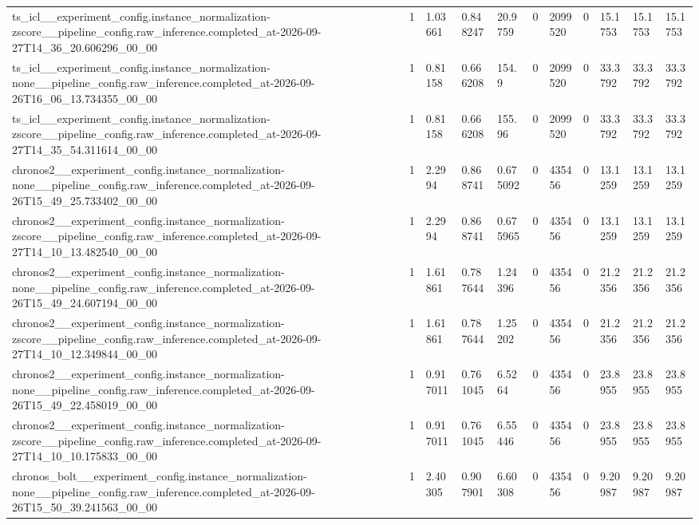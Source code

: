 \begin{tabular}{lllllllllll}
ts\_icl\_\_experiment\_config.instance\_normalization-zscore\_\_pipeline\_config.raw\_inference.completed\_at-2026-09-27T14\_36\_20.606296\_00\_00 & 1 & 1.03661 & 0.848247 & 20.9759 & 0 & 2099520 & 0 & 15.1753 & 15.1753 & 15.1753 \\
ts\_icl\_\_experiment\_config.instance\_normalization-none\_\_pipeline\_config.raw\_inference.completed\_at-2026-09-26T16\_06\_13.734355\_00\_00 & 1 & 0.81158 & 0.666208 & 154.9 & 0 & 2099520 & 0 & 33.3792 & 33.3792 & 33.3792 \\
ts\_icl\_\_experiment\_config.instance\_normalization-zscore\_\_pipeline\_config.raw\_inference.completed\_at-2026-09-27T14\_35\_54.311614\_00\_00 & 1 & 0.81158 & 0.666208 & 155.96 & 0 & 2099520 & 0 & 33.3792 & 33.3792 & 33.3792 \\
chronos2\_\_experiment\_config.instance\_normalization-none\_\_pipeline\_config.raw\_inference.completed\_at-2026-09-26T15\_49\_25.733402\_00\_00 & 1 & 2.2994 & 0.868741 & 0.675092 & 0 & 435456 & 0 & 13.1259 & 13.1259 & 13.1259 \\
chronos2\_\_experiment\_config.instance\_normalization-zscore\_\_pipeline\_config.raw\_inference.completed\_at-2026-09-27T14\_10\_13.482540\_00\_00 & 1 & 2.2994 & 0.868741 & 0.675965 & 0 & 435456 & 0 & 13.1259 & 13.1259 & 13.1259 \\
chronos2\_\_experiment\_config.instance\_normalization-none\_\_pipeline\_config.raw\_inference.completed\_at-2026-09-26T15\_49\_24.607194\_00\_00 & 1 & 1.61861 & 0.787644 & 1.24396 & 0 & 435456 & 0 & 21.2356 & 21.2356 & 21.2356 \\
chronos2\_\_experiment\_config.instance\_normalization-zscore\_\_pipeline\_config.raw\_inference.completed\_at-2026-09-27T14\_10\_12.349844\_00\_00 & 1 & 1.61861 & 0.787644 & 1.25202 & 0 & 435456 & 0 & 21.2356 & 21.2356 & 21.2356 \\
chronos2\_\_experiment\_config.instance\_normalization-none\_\_pipeline\_config.raw\_inference.completed\_at-2026-09-26T15\_49\_22.458019\_00\_00 & 1 & 0.917011 & 0.761045 & 6.5264 & 0 & 435456 & 0 & 23.8955 & 23.8955 & 23.8955 \\
chronos2\_\_experiment\_config.instance\_normalization-zscore\_\_pipeline\_config.raw\_inference.completed\_at-2026-09-27T14\_10\_10.175833\_00\_00 & 1 & 0.917011 & 0.761045 & 6.55446 & 0 & 435456 & 0 & 23.8955 & 23.8955 & 23.8955 \\
chronos\_bolt\_\_experiment\_config.instance\_normalization-none\_\_pipeline\_config.raw\_inference.completed\_at-2026-09-26T15\_50\_39.241563\_00\_00 & 1 & 2.40305 & 0.907901 & 6.60308 & 0 & 435456 & 0 & 9.20987 & 9.20987 & 9.20987 \\

\end{tabular}
